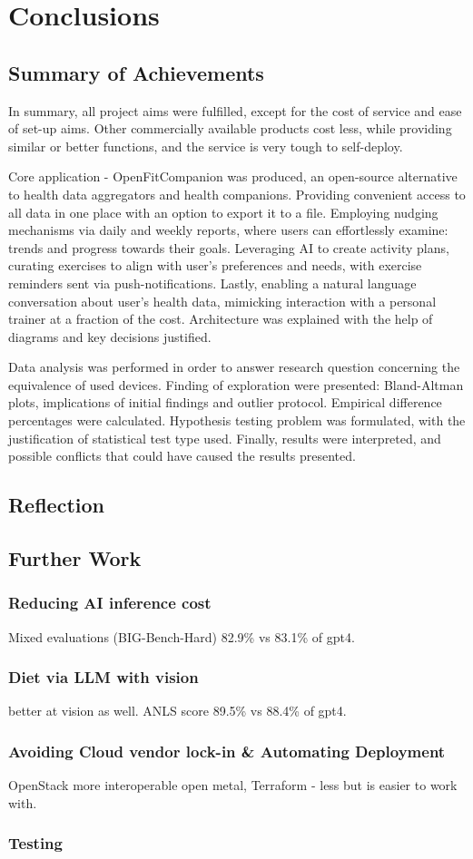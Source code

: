 \chapter{Conclusions}
\label{cha:evaluation}
\section{Summary of Achievements}
In summary, all project aims were fulfilled, except for the cost of service and ease of set-up aims. Other commercially available products cost less, while providing similar or better functions, and the service is very tough to self-deploy.

Core application - OpenFitCompanion was produced, an open-source alternative to health data aggregators and health companions. Providing convenient access to all data in one place with an option to export it to a file. Employing nudging mechanisms via daily and weekly reports, where users can effortlessly examine: trends and progress towards their goals. Leveraging AI to create activity plans, curating exercises to align with user's preferences and needs, with exercise reminders sent via push-notifications. Lastly, enabling a natural language conversation about user's health data, mimicking interaction with a personal trainer at a fraction of the cost. Architecture was explained with the help of diagrams and key decisions justified. 

Data analysis was performed in order to answer research question concerning the equivalence of used devices. Finding of exploration were presented: Bland-Altman plots, implications of initial findings and outlier protocol. Empirical difference percentages were calculated. Hypothesis testing problem was formulated, with the justification of statistical test type used. Finally, results were interpreted, and possible conflicts that could have caused the results presented. 
\section{Reflection}
\section{Further Work}
\subsection{Reducing AI inference cost}
Mixed evaluations (BIG-Bench-Hard) 82.9\% vs 83.1\% of gpt4.
\subsection{Diet via LLM with vision}
better at vision as well. ANLS score 89.5\% vs 88.4\% of gpt4.
\subsection{Avoiding Cloud vendor lock-in \& Automating Deployment}
OpenStack more interoperable open metal, Terraform - less but is easier to work with.
\subsection{Testing}
